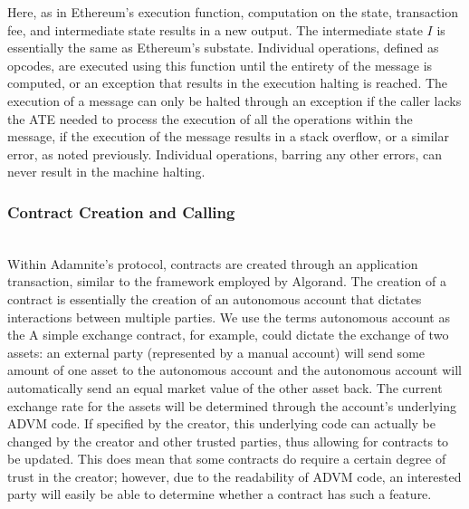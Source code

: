 \documentclass[conference]{IEEEtran}
\begin{document}
Here, as in Ethereum's execution function, computation on the state, transaction fee, and intermediate state results in a new output. The intermediate state $I$ is essentially the same as Ethereum's substate. Individual operations, defined as opcodes, are executed using this function until the entirety of the message is computed, or an exception that results in the execution halting is reached. The execution of a message can only be halted through an exception if the caller lacks the ATE needed to process the execution of all the operations within the message, if the execution of the message results in a stack overflow, or a similar error, as noted previously. Individual operations, barring any other errors, can never result in the machine halting.\\

\subsubsection{Contract Creation and Calling}\\
Within Adamnite's protocol, contracts are created through an application transaction, similar to the framework employed by Algorand. The creation of a contract is essentially the creation of an autonomous account that dictates interactions between multiple parties. We use the terms autonomous account as the   A simple exchange contract, for example, could dictate the exchange of two assets: an external party (represented by a manual account) will send some amount of one asset to the autonomous account and the autonomous account will automatically send an equal market value of the other asset back. The current exchange rate for the assets will be determined through the account's underlying ADVM code. If specified by the creator, this underlying code can actually be changed by the creator and other trusted parties, thus allowing for contracts to be updated. This does mean that some contracts do require a certain degree of trust in the creator; however, due to the readability of ADVM code, an interested party will easily be able to determine whether a contract has such a feature.\\
\end{document}
